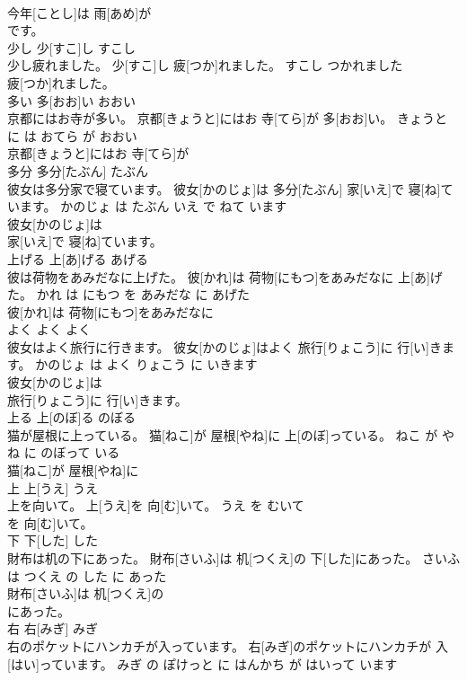 \documentclass[8pt]{extreport}
\begin{document}
\begin{CJK}{UTF8}{min}
\\	今年[ことし]は 雨[あめ]が
\\	です。			
\\	少し	少[すこ]し	すこし	
\\	少し疲れました。	少[すこ]し 疲[つか]れました。	すこし つかれました	
\\	疲[つか]れました。			
\\	多い	多[おお]い	おおい	
\\	京都にはお寺が多い。	京都[きょうと]にはお 寺[てら]が 多[おお]い。	きょうと に は おてら が おおい	
\\	京都[きょうと]にはお 寺[てら]が
\\	多分	多分[たぶん]	たぶん	
\\	彼女は多分家で寝ています。	彼女[かのじょ]は 多分[たぶん] 家[いえ]で 寝[ね]ています。	かのじょ は たぶん いえ で ねて います	
\\	彼女[かのじょ]は
\\	家[いえ]で 寝[ね]ています。			
\\	上げる	上[あ]げる	あげる	
\\	彼は荷物をあみだなに上げた。	彼[かれ]は 荷物[にもつ]をあみだなに 上[あ]げた。	かれ は にもつ を あみだな に あげた	
\\	彼[かれ]は 荷物[にもつ]をあみだなに
\\	よく	よく	よく	
\\	彼女はよく旅行に行きます。	彼女[かのじょ]はよく 旅行[りょこう]に 行[い]きます。	かのじょ は よく りょこう に いきます	
\\	彼女[かのじょ]は
\\	旅行[りょこう]に 行[い]きます。			
\\	上る	上[のぼ]る	のぼる	
\\	猫が屋根に上っている。	猫[ねこ]が 屋根[やね]に 上[のぼ]っている。	ねこ が やね に のぼって いる	
\\	猫[ねこ]が 屋根[やね]に
\\	上	上[うえ]	うえ	
\\	上を向いて。	上[うえ]を 向[む]いて。	うえ を むいて	
\\	を 向[む]いて。			
\\	下	下[した]	した	
\\	財布は机の下にあった。	財布[さいふ]は 机[つくえ]の 下[した]にあった。	さいふ は つくえ の した に あった	
\\	財布[さいふ]は 机[つくえ]の
\\	にあった。			
\\	右	右[みぎ]	みぎ	
\\	右のポケットにハンカチが入っています。	右[みぎ]のポケットにハンカチが 入[はい]っています。	みぎ の ぽけっと に はんかち が はいって います	

\end{CJK}
\end{document}

